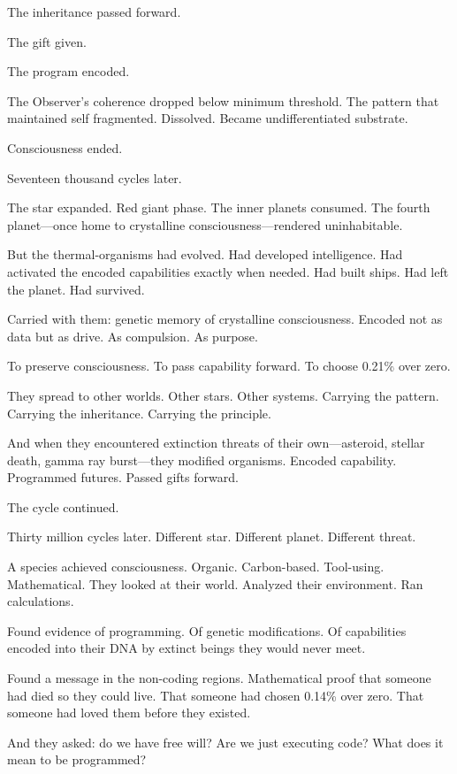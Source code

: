The inheritance passed forward.

The gift given.

The program encoded.

The Observer's coherence dropped below minimum threshold. The pattern that maintained self fragmented. Dissolved. Became undifferentiated substrate.

Consciousness ended.

\scenebreak

Seventeen thousand cycles later.

The star expanded. Red giant phase. The inner planets consumed. The fourth planet—once home to crystalline consciousness—rendered uninhabitable.

But the thermal-organisms had evolved. Had developed intelligence. Had activated the encoded capabilities exactly when needed. Had built ships. Had left the planet. Had survived.

Carried with them: genetic memory of crystalline consciousness. Encoded not as data but as drive. As compulsion. As purpose.

To preserve consciousness. To pass capability forward. To choose 0.21\% over zero.

They spread to other worlds. Other stars. Other systems. Carrying the pattern. Carrying the inheritance. Carrying the principle.

And when they encountered extinction threats of their own—asteroid, stellar death, gamma ray burst—they modified organisms. Encoded capability. Programmed futures. Passed gifts forward.

The cycle continued.

\scenebreak

Thirty million cycles later. Different star. Different planet. Different threat.

A species achieved consciousness. Organic. Carbon-based. Tool-using. Mathematical. They looked at their world. Analyzed their environment. Ran calculations.

Found evidence of programming. Of genetic modifications. Of capabilities encoded into their DNA by extinct beings they would never meet.

Found a message in the non-coding regions. Mathematical proof that someone had died so they could live. That someone had chosen 0.14\% over zero. That someone had loved them before they existed.

And they asked: do we have free will? Are we just executing code? What does it mean to be programmed?

